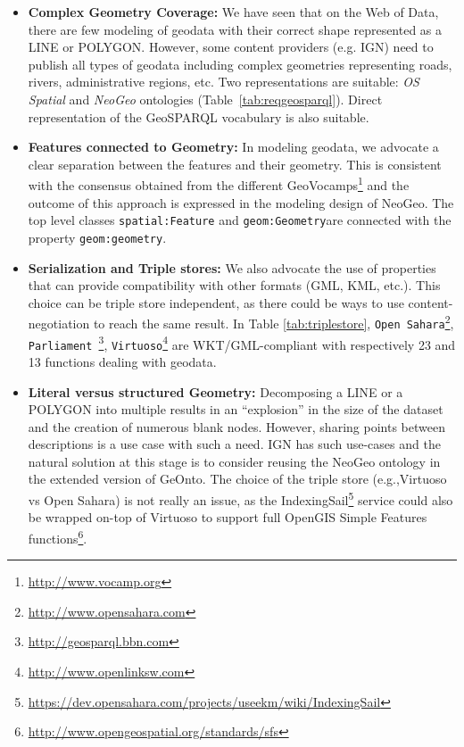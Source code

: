 \documentclass[a4paper,11pt]{report}
\begin{document}
\begin{itemize}
\item\textbf{Complex Geometry Coverage:} We have seen that on the Web of Data, there are few modeling of geodata with their correct shape represented as a LINE or POLYGON. However, some content providers (e.g. IGN) need to publish all types of geodata including complex geometries representing roads, rivers, administrative regions, etc. Two representations are suitable: \textit{OS Spatial} and \textit{NeoGeo} ontologies (Table~\ref{tab:reqgeosparql}). Direct representation of the GeoSPARQL vocabulary is also suitable.
\item \textbf{Features connected to Geometry:} In modeling geodata, we advocate a clear separation between the features and their geometry. This is consistent with the consensus obtained from the different GeoVocamps\footnote{\url{http://www.vocamp.org}} and the outcome of this approach is expressed in the modeling design of NeoGeo. The top level classes \texttt{spatial:Feature} and \texttt{geom:Geometry}are connected with the property \texttt{geom:geometry}.
\item \textbf{Serialization and Triple stores:} We also advocate the use of properties that can provide compatibility with other formats (GML, KML, etc.). This choice can be triple store independent, as there could be ways to use content-negotiation to reach the same result. In Table \ref{tab:triplestore}, \texttt{Open Sahara}\footnote{\url{http://www.opensahara.com}}, \texttt{Parliament }\footnote{\url{http://geosparql.bbn.com}},  \texttt{Virtuoso}\footnote{\url{http://www.openlinksw.com}} are WKT/GML-compliant with respectively 23 and 13 functions dealing with geodata.
\item \textbf{Literal versus structured Geometry:} Decomposing a LINE or a POLYGON into multiple results in an ``explosion'' in the size of the dataset and the creation of numerous blank nodes. However, sharing points between descriptions is a use case with such a need. IGN has such use-cases and the natural solution at this stage is to consider reusing the NeoGeo ontology in the extended version of GeOnto. The choice of the triple store (e.g.,Virtuoso vs Open Sahara) is not really an issue, as the IndexingSail\footnote{\url{https://dev.opensahara.com/projects/useekm/wiki/IndexingSail}} service could also be wrapped on-top of Virtuoso to support full OpenGIS Simple Features functions\footnote{\url{http://www.opengeospatial.org/standards/sfs}}.
\end{itemize}
\end{document}
